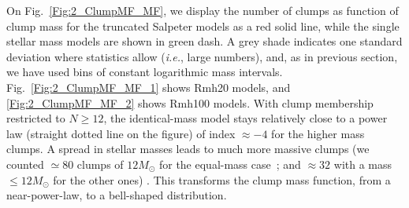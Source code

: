 On Fig.~\ref{Fig:2_ClumpMF_MF}, we display the  number of clumps as function of clump mass for the truncated Salpeter  models as a red solid line, while the single stellar mass models are shown in green dash. A grey shade indicates one standard deviation where statistics allow ({\it i.e.}, large numbers), and, as in previous section, we have used bins of constant logarithmic mass intervals.  Fig.~\ref{Fig:2_ClumpMF_MF_1} shows Rmh20 models, and \ref{Fig:2_ClumpMF_MF_2} shows Rmh100 models. 
With clump membership restricted to $N \geq 12$, the identical-mass model  stays relatively close to a power law (straight dotted line on the figure) of index $\approx -4$ for the higher mass clumps. A spread in stellar masses leads to much more massive clumps (we counted $\simeq80$ clumps of $12 M_\odot$ for the equal-mass case~; and $\approx 32$ with a mass $ \le 12 M_\odot$ for the other ones) . This transforms the clump mass function, from a near-power-law, to a bell-shaped distribution.  





